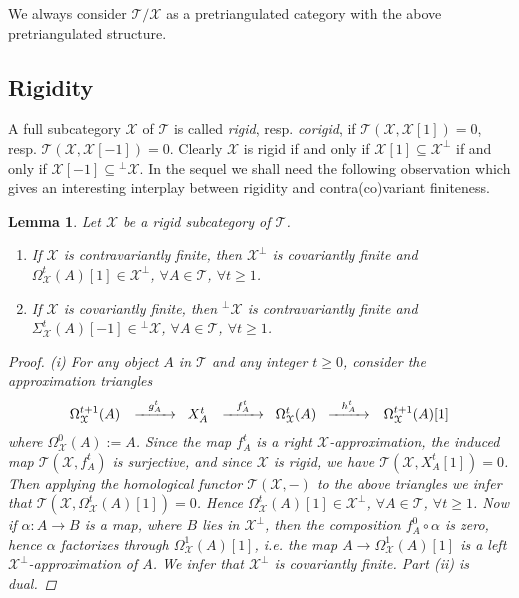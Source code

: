 \documentclass[oneside, a4paper,reqno]{amsart}
\numberwithin{equation}{section}
\newtheorem{lem}[thm]{Lemma}
\theoremstyle{definition}
\begin{document}
We always consider ${\mathcal T}/{\mathcal X}$ as a pretriangulated category with the above pretriangulated structure.  

\subsection{Rigidity} A full subcategory ${\mathcal X}$ of ${\mathcal T}$ is called {\em rigid}, resp. {\em corigid}, if ${\mathcal T}({\mathcal X},{\mathcal X}[1]) = 0$, resp. ${\mathcal T}({\mathcal X},{\mathcal X}[-1]) = 0$. Clearly ${\mathcal X}$ is rigid if and only if ${\mathcal X}[1] \subseteq {\mathcal X}^{\bot}$ if and only if ${\mathcal X}[-1] \subseteq {^{\bot}}{\mathcal X}$.  In the sequel we shall need the following observation which gives an interesting interplay between rigidity and contra(co)variant finiteness.    

\begin{lem} Let ${\mathcal X}$ be a rigid subcategory of ${\mathcal T}$. 
\begin{enumerate}
\item If ${\mathcal X}$ is contravariantly finite, then ${\mathcal X}^{\bot}$ is covariantly finite and \ $\Omega^{t}_{\mathcal X}(A)[1] \in {\mathcal X}^{\bot}$, $\forall A\in {\mathcal T}$,  $\forall t \geq 1$.  
\item If ${\mathcal X}$ is covariantly finite, then ${^{\bot}}{\mathcal X}$ is contravariantly finite and  \ $\Sigma^{t}_{\mathcal X}(A)[-1] \in {^{\bot}}{\mathcal X}$,  $\forall A\in {\mathcal T}$,  $\forall t \geq 1$.   
\end{enumerate}
\begin{proof} (i) For any object $A$ in ${\mathcal T}$ and any integer $t \geq 0$, consider the approximation triangles 
\[
\begin{CD}
\Omega^{t+1}_{\mathcal X}(A) \,\ @> g^{t}_{A} >>  \,\, X^{t}_{A} \,\ @> f^{t}_{A} >>  \,\, \Omega^{t}_{\mathcal X}(A) \,\, @> h^{t}_{A} >>  \,\ \Omega^{t+1}_{\mathcal X}(A)[1]
\end{CD}
\]
where $\Omega^{0}_{\mathcal X}(A) := A$. Since the map $f^{t}_{A}$ is a right ${\mathcal X}$-approximation, the induced map ${\mathcal T}({\mathcal X},f^{t}_{A})$ is surjective, and since  ${\mathcal X}$ is rigid, we have ${\mathcal T}({\mathcal X},X^{t}_{A}[1]) = 0$. Then applying the homological functor ${\mathcal T}({\mathcal X},-)$ to the above triangles we infer that  ${\mathcal T}({\mathcal X},\Omega^{t}_{\mathcal X}(A)[1]) = 0$.  Hence $\Omega^{t}_{\mathcal X}(A)[1] \in {\mathcal X}^{\bot}$, $\forall A\in {\mathcal T}$,  $\forall t \geq 1$.  Now if $\alpha \colon A {\longrightarrow} B$ is a map, where $B$ lies in ${\mathcal X}^{\bot}$, then the composition $f^{0}_{A} \circ \alpha$ is zero, hence $\alpha$ factorizes through $\Omega^{1}_{\mathcal X}(A)[1]$, i.e. the map $A {\longrightarrow} \Omega^{1}_{\mathcal X}(A)[1]$ is a left ${\mathcal X}^{\bot}$-approximation of $A$.  We infer that ${\mathcal X}^{\bot}$ is covariantly finite.  Part (ii) is dual.  
\end{proof}
\end{lem}
\end{document}
